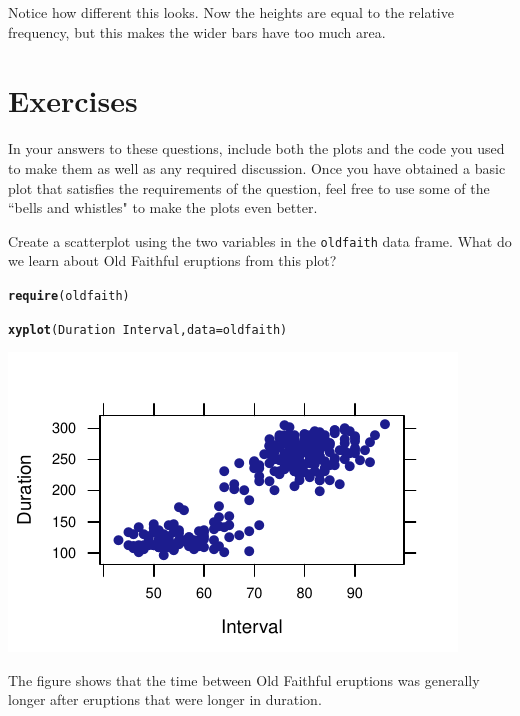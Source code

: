 \documentclass[twoside]{book}\usepackage[]{graphicx}\usepackage[]{xcolor}
\makeatletter
\def\maxwidth{ %
  \ifdim\Gin@nat@width>\linewidth
    \linewidth
  \else
    \Gin@nat@width
  \fi
}
\newcommand{\hlopt}[1]{\textcolor[rgb]{0,0,0}{#1}}%
\newcommand{\hlstd}[1]{\textcolor[rgb]{0.345,0.345,0.345}{#1}}%
\newcommand{\hlkwc}[1]{\textcolor[rgb]{0.333,0.667,0.333}{#1}}%
\newcommand{\hlkwd}[1]{\textcolor[rgb]{0.737,0.353,0.396}{\textbf{#1}}}%
\newenvironment{kframe}{%
 \def\at@end@of@kframe{}%
 \ifinner\ifhmode%
  \def\at@end@of@kframe{\end{minipage}}%
  \begin{minipage}{\columnwidth}%
 \fi\fi%
 \def\FrameCommand##1{\hskip\@totalleftmargin \hskip-\fboxsep
 \colorbox{shadecolor}{##1}\hskip-\fboxsep
     \hskip-\linewidth \hskip-\@totalleftmargin \hskip\columnwidth}%
 \MakeFramed {\advance\hsize-\width
   \@totalleftmargin\z@ \linewidth\hsize
   \@setminipage}}%
 {\par\unskip\endMakeFramed%
 \at@end@of@kframe}
\newenvironment{knitrout}{}{} %
\newcommand{\Rindex}[1]{\index{\texttt{#1}}}
\newcommand{\dataframe}[1]{{\color{blue!80!black}\texttt{#1}}\Rindex{#1}}
\makeatother
\begin{document}
Notice how different this looks.  Now the heights are equal to the relative
frequency, but this makes the wider bars have too much area.

\newpage

\section*{Exercises}

In your answers to these questions, include both the plots and the code you used 
to make them as well as any required discussion.  Once you have obtained a basic
plot that satisfies the requirements of the question, feel free to 
use some of the ``bells and whistles" to make the plots even better.

\begin{problem}
	Create a scatterplot using the two variables in the \dataframe{oldfaith}
	data frame.  What do we learn about Old Faithful eruptions from this plot?
\end{problem}

\begin{solution}
\begin{knitrout}
\color{fgcolor}\begin{kframe}
\begin{alltt}
\hlkwd{require}\hlstd{(oldfaith)}
\end{alltt}


{\ttfamily\noindent\itshape\color{messagecolor}{\#\# Loading required package: oldfaith}}

{\ttfamily\noindent\color{warningcolor}{\#\# Warning in library(package, lib.loc = lib.loc, character.only = TRUE, logical.return = TRUE, : there is no package called 'oldfaith'}}\begin{alltt}
\hlkwd{xyplot}\hlstd{(Duration} \hlopt{~} \hlstd{Interval,} \hlkwc{data} \hlstd{= oldfaith)}
\end{alltt}
\end{kframe}

{\centering \includegraphics[width=\maxwidth]{figures/fig-unnamed-chunk-17-1} 

}



\end{knitrout}
The figure shows that the time between Old Faithful eruptions was generally longer after eruptions that were longer in duration.
\end{solution}
\end{document}
